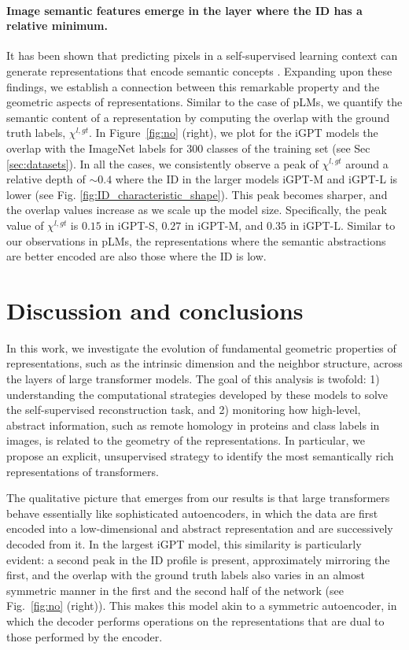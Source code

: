 \documentclass{article}
\begin{document}
\paragraph{Image semantic features emerge in the layer where the ID has a relative minimum.}
\label{subsub:image_label}
%
It has been shown that predicting pixels in a self-supervised learning context can generate representations that encode semantic concepts \cite{igpt}. 
%
Expanding upon these findings, we establish a connection between this remarkable property and the geometric aspects of representations. 
%
Similar to the case of pLMs, we quantify the semantic content of a representation by computing the overlap with the ground truth labels, $\chi^{l, gt}$.
%
In Figure~\ref{fig:no} (right), we plot for the iGPT models the overlap with the ImageNet labels for 300 classes of the training set (see Sec \ref{sec:datasets}).
%
In all the cases, we consistently observe a peak of $\chi^{l, gt}$ around a relative depth of $\sim 0.4$ where the ID in the larger models iGPT-M and iGPT-L is lower (see Fig.
\ref{fig:ID_characteristic_shape}).
%
This peak becomes sharper, and the overlap values increase as we scale up the model size. 
%
Specifically, the peak value of $\chi^{l, gt}$ is $0.15$ in iGPT-S, $0.27$ in iGPT-M, and $0.35$ in iGPT-L.
%
Similar to our observations in pLMs, the representations where the semantic abstractions are better encoded are also those where the ID is low. 


\section{Discussion and conclusions}
%
In this work, we investigate the evolution of fundamental geometric properties of representations, such as the intrinsic dimension and the neighbor structure, across the layers of large transformer models. 
%
The goal of this analysis is twofold: 1) understanding the computational strategies developed by these models to solve the self-supervised reconstruction task, and 2) monitoring how high-level, abstract information, such as remote homology in proteins and class labels in images, is related to the geometry of the representations. In particular, we propose an explicit, unsupervised strategy to identify the most semantically rich representations of transformers.

The qualitative picture that emerges from our results is that large transformers behave essentially like sophisticated autoencoders, in which the data are first encoded into a low-dimensional and abstract representation and are successively decoded from it. 
In the largest iGPT model, this similarity is particularly evident: a second peak in the ID profile is present, approximately mirroring the first, and the overlap with the ground truth labels also varies in an almost symmetric manner in the first and the second half of the network (see Fig.~\ref{fig:no} (right)). This makes this model akin to a symmetric autoencoder, in which the decoder performs operations on the representations that are dual to those performed by the encoder.
\end{document}
